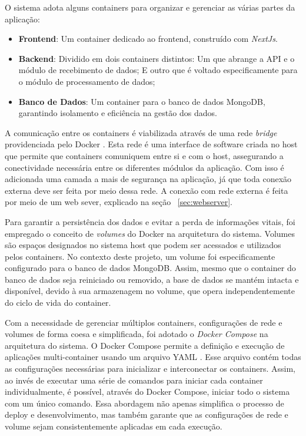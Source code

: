 O sistema adota alguns containers para organizar e gerenciar as várias partes da aplicação:
\begin{itemize}
    \item \textbf{Frontend}: Um container dedicado ao frontend, construído com \textit{NextJs}.
    \item \textbf{Backend}: Dividido em dois containers distintos:
	\subitem Um que abrange a \gls{API} e o módulo de recebimento de dados;
	\subitem E outro que é voltado especificamente para o módulo de processamento de dados;
    \item \textbf{Banco de Dados}: Um container para o banco de dados MongoDB, garantindo isolamento e eficiência na gestão dos dados.
\end{itemize}

A comunicação entre os containers é viabilizada através de uma rede \textit{bridge} providenciada pelo Docker \cite{dockerNetwork}. Esta rede é uma interface de software criada no host que permite que containers comuniquem entre si e com o host, assegurando a conectividade necessária entre os diferentes módulos da aplicação. Com isso é adicionada uma camada a mais de segurança na aplicação, já que toda conexão externa deve ser feita por meio dessa rede. A conexão com rede externa é feita por meio de um web sever, explicado na seção ~\ref{sec:webserver}.

Para garantir a persistência dos dados e evitar a perda de informações vitais, foi empregado o conceito de \textit{volumes} \cite{dockerVolumes} do Docker na arquitetura do sistema. Volumes são espaços designados no sistema host que podem ser acessados e utilizados pelos containers. No contexto deste projeto, um volume foi especificamente configurado para o banco de dados MongoDB. Assim, mesmo que o container do banco de dados seja reiniciado ou removido, a base de dados se mantém intacta e disponível, devido à sua armazenagem no volume, que opera independentemente do ciclo de vida do container.

Com a necessidade de gerenciar múltiplos containers, configurações de rede e volumes de forma coesa e simplificada, foi adotado o \textit{Docker Compose} \cite{dockerCompose} na arquitetura do sistema. O Docker Compose permite a definição e execução de aplicações multi-container usando um arquivo YAML \cite{yamlOrg}. Esse arquivo contém todas as configurações necessárias para inicializar e interconectar os containers. Assim, ao invés de executar uma série de comandos para iniciar cada container individualmente, é possível, através do Docker Compose, iniciar todo o sistema com um único comando. Essa abordagem não apenas simplifica o processo de deploy e desenvolvimento, mas também garante que as configurações de rede e volume sejam consistentemente aplicadas em cada execução.

